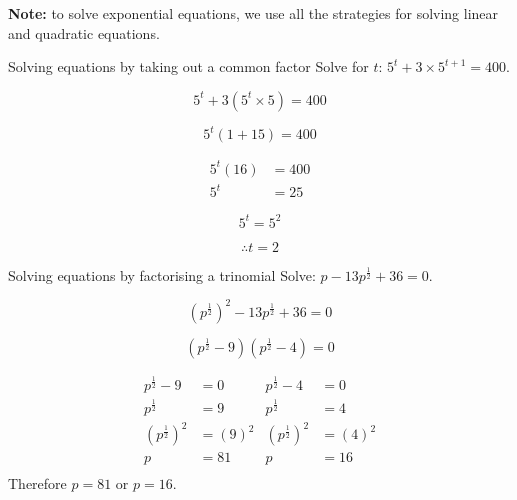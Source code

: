 \textbf{Note:} to solve exponential equations, we use all the strategies for solving linear and quadratic equations.

\begin{wex}
{Solving equations by taking out a common factor}
{Solve for $t$: $5^t + 3 \times 5^{t+1} = 400$.}
{
\begin{equation*}
  5^t + 3 ( 5^t \times 5) = 400 
\end{equation*}

\begin{equation*}
 5^t(1 + 15) = 400 
\end{equation*}


\begin{align*}
 5^t(16) &= 400 \\
  5^t &= 25 
\end{align*}


\begin{equation*}
  5^t = 5^2 
\end{equation*}


\begin{equation*}
\therefore t = 2
\end{equation*}
}
\end{wex}

\begin{wex}
{Solving equations by factorising a trinomial}
{Solve: $ p-13 p^{\frac{1}{2}} + 36 =  0$.}
{

$$ (p^{\frac{1}{2}})^2 -13p^{\frac{1}{2}} + 36 = 0 $$


$$ (p^{\frac{1}{2}} -9)(p^{\frac{1}{2}}-4) = 0 $$


\begin{align*}
p^{\frac{1}{2}} - 9 &= 0			&   p^{\frac{1}{2}} - 4 &= 0		\\
p^{\frac{1}{2}} &= 9				&   p^{\frac{1}{2}} &= 4		\\		
(p^{\frac{1}{2}})^2 &= (9)^2			&   (p^{\frac{1}{2}})^2 &= (4)^2\\
p &= 81				&   p &= 16\\
\end{align*} 
Therefore $p=81$ or $p=16$.
}
\end{wex}

